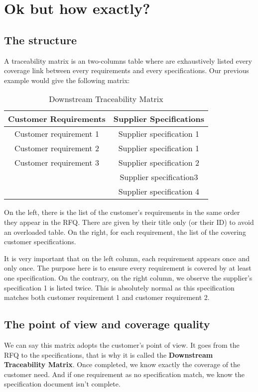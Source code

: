 \section{Ok but how exactly?}
\subsection{The structure}
A traceability matrix is an two-columns table where are exhaustively listed every coverage link between every requirements and every specifications. Our previous example would give the following matrix:

\begin{table*}
	\centering
		\begin{tabular}{|c|c|}
			\hline
			Customer Requirements & Supplier Specifications\\
            \hline
            Customer requirement 1 & Supplier specification 1\\
            \hline
            Customer requirement 2 & Supplier specification 1\\
            \hline
            Customer requirement 3 & Supplier specification 2\\
            &Supplier specification3\\
            &Supplier specification 4\\
            \hline
		\end{tabular}
	\caption{Downstream Traceability Matrix}
	\label{tab:DownstreamTraceabilityMatrix}
\end{table*}

On the left, there is the list of the customer’s requirements in the same order they appear in the RFQ. There are given by their title only (or their ID) to avoid an overloaded table.
On the right, for each requirement, the list of the covering customer specifications.

It is very important that on the left column, each requirement appears once and only once. The purpose here is to ensure every requirement is covered by at least one specification.
On the contrary, on the right column, we observe the supplier’s specification 1 is listed twice. This is absolutely normal as this specification matches both customer requirement 1 and customer requirement 2.

\subsection{The point of view and coverage quality}
We can say this matrix adopts the customer’s point of view. It goes from the RFQ to the specifications, that is why it is called the \textbf{Downstream Traceability Matrix}. Once completed, we know exactly the coverage of the customer need. And if one requirement as no specification match, we know the specification document isn’t complete.

